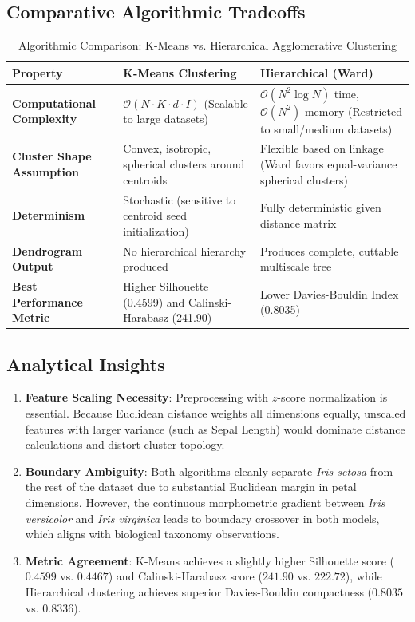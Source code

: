 \documentclass[12pt]{article}
\begin{document}
\subsection{Comparative Algorithmic Tradeoffs}
\begin{table}[H]
\centering
\caption{Algorithmic Comparison: K-Means vs. Hierarchical Agglomerative Clustering}
\label{tab:comparison}
\begin{tabular}{p{3.5cm}p{5.5cm}p{5.5cm}}
\toprule
\textbf{Property} & \textbf{K-Means Clustering} & \textbf{Hierarchical (Ward)} \\
\midrule
\textbf{Computational Complexity} & $\mathcal{O}(N \cdot K \cdot d \cdot I)$ (Scalable to large datasets) & $\mathcal{O}(N^2 \log N)$ time, $\mathcal{O}(N^2)$ memory (Restricted to small/medium datasets) \\
\addlinespace
\textbf{Cluster Shape Assumption} & Convex, isotropic, spherical clusters around centroids & Flexible based on linkage (Ward favors equal-variance spherical clusters) \\
\addlinespace
\textbf{Determinism} & Stochastic (sensitive to centroid seed initialization) & Fully deterministic given distance matrix \\
\addlinespace
\textbf{Dendrogram Output} & No hierarchical hierarchy produced & Produces complete, cuttable multiscale tree \\
\addlinespace
\textbf{Best Performance Metric} & Higher Silhouette (0.4599) and Calinski-Harabasz (241.90) & Lower Davies-Bouldin Index (0.8035) \\
\bottomrule
\end{tabular}
\end{table}

\subsection{Analytical Insights}
\begin{enumerate}
    \item \textbf{Feature Scaling Necessity}: Preprocessing with $z$-score normalization is essential. Because Euclidean distance weights all dimensions equally, unscaled features with larger variance (such as Sepal Length) would dominate distance calculations and distort cluster topology.
    \item \textbf{Boundary Ambiguity}: Both algorithms cleanly separate \textit{Iris setosa} from the rest of the dataset due to substantial Euclidean margin in petal dimensions. However, the continuous morphometric gradient between \textit{Iris versicolor} and \textit{Iris virginica} leads to boundary crossover in both models, which aligns with biological taxonomy observations.
    \item \textbf{Metric Agreement}: K-Means achieves a slightly higher Silhouette score ($0.4599$ vs. $0.4467$) and Calinski-Harabasz score ($241.90$ vs. $222.72$), while Hierarchical clustering achieves superior Davies-Bouldin compactness ($0.8035$ vs. $0.8336$).
\end{enumerate}
\end{document}
